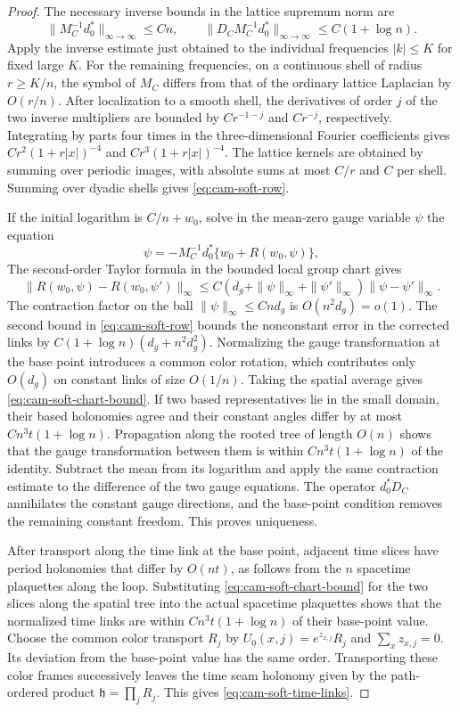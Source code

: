 \documentclass[11pt,a4paper]{article}
\numberwithin{equation}{section}
\newcommand{\hper}{\mathfrak h}
\begin{document}
\begin{proof}
The necessary inverse bounds in the lattice supremum norm are
\begin{equation}
        \|M_C^{-1}d_0^*\|_{\infty\to\infty}\le Cn,\qquad
        \|D_CM_C^{-1}d_0^*\|_{\infty\to\infty}
                                    \le C(1+\log n).     \label{eq:cam-soft-row}
\end{equation}
Apply the inverse estimate just obtained to the individual frequencies \(|k|\le K\) for fixed large \(K\). For the remaining frequencies, on a continuous shell of radius \(r\ge K/n\), the symbol of \(M_C\) differs from that of the ordinary lattice Laplacian by \(O(r/n)\). After localization to a smooth shell, the derivatives of order \(j\) of the two inverse multipliers are bounded by \(Cr^{-1-j}\) and \(Cr^{-j}\), respectively. Integrating by parts four times in the three-dimensional Fourier coefficients gives \(Cr^2(1+r|x|)^{-4}\) and \(Cr^3(1+r|x|)^{-4}\). The lattice kernels are obtained by summing over periodic images, with absolute sums at most \(C/r\) and \(C\) per shell. Summing over dyadic shells gives \eqref{eq:cam-soft-row}.

If the initial logarithm is \(C/n+w_0\), solve in the mean-zero gauge variable \(\psi\) the equation
\[
 \psi=-M_C^{-1}d_0^*\{w_0+R(w_0,\psi)\},
\]
The second-order Taylor formula in the bounded local group chart gives
\[
 \|R(w_0,\psi)-R(w_0,\psi')\|_\infty
 \le C(d_g+\|\psi\|_\infty+\|\psi'\|_\infty)\|\psi-\psi'\|_\infty .
\]
The contraction factor on the ball \(\|\psi\|_\infty\le Cnd_g\) is \(O(n^2d_g)=o(1)\). The second bound in \eqref{eq:cam-soft-row} bounds the nonconstant error in the corrected links by \(C(1+\log n)(d_g+n^2d_g^2)\). Normalizing the gauge transformation at the base point introduces a common color rotation, which contributes only \(O(d_g)\) on constant links of size \(O(1/n)\). Taking the spatial average gives \eqref{eq:cam-soft-chart-bound}. If two based representatives lie in the small domain, their based holonomies agree and their constant angles differ by at most \(Cn^3t(1+\log n)\). Propagation along the rooted tree of length \(O(n)\) shows that the gauge transformation between them is within \(Cn^3t(1+\log n)\) of the identity. Subtract the mean from its logarithm and apply the same contraction estimate to the difference of the two gauge equations. The operator \(d_0^*D_C\) annihilates the constant gauge directions, and the base-point condition removes the remaining constant freedom. This proves uniqueness.

After transport along the time link at the base point, adjacent time slices have period holonomies that differ by \(O(nt)\), as follows from the \(n\) spacetime plaquettes along the loop. Substituting \eqref{eq:cam-soft-chart-bound} for the two slices along the spatial tree into the actual spacetime plaquettes shows that the normalized time links are within \(Cn^3t(1+\log n)\) of their base-point value. Choose the common color transport \(R_j\) by \(U_0(x,j)=e^{z_{x,j}}R_j\) and \(\sum_x z_{x,j}=0\). Its deviation from the base-point value has the same order. Transporting these color frames successively leaves the time seam holonomy given by the path-ordered product \(\hper=\prod_j R_j\). This gives \eqref{eq:cam-soft-time-links}.
\end{proof}
\end{document}
